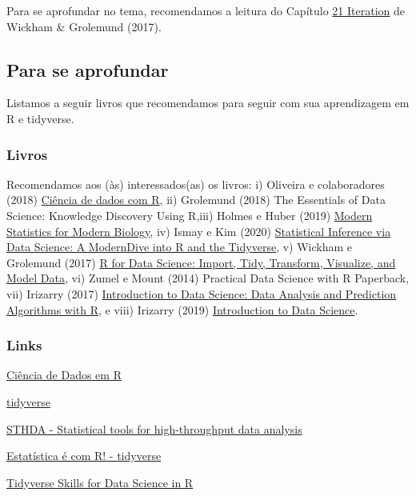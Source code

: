 \documentclass[
]{article}
\begin{document}
Para se aprofundar no tema, recomendamos a leitura do Capítulo \href{https://r4ds.had.co.nz/iteration.html}{21 Iteration} de Wickham \& Grolemund (2017).

\hypertarget{para-se-aprofundar-1}{%
\subsection{Para se aprofundar}\label{para-se-aprofundar-1}}

Listamos a seguir livros que recomendamos para seguir com sua aprendizagem em R e tidyverse.

\hypertarget{livros-1}{%
\subsubsection{Livros}\label{livros-1}}

Recomendamos aos (às) interessados(as) os livros: i) Oliveira e colaboradores (2018) \href{https://cdr.ibpad.com.br/}{Ciência de dados com R}, ii) Grolemund (2018) The Essentials of Data Science: Knowledge Discovery Using R,iii) Holmes e Huber (2019) \href{https://www.huber.embl.de/msmb/}{Modern Statistics for Modern Biology}, iv) Ismay e Kim (2020) \href{https://moderndive.com/}{Statistical Inference via Data Science: A ModernDive into R and the Tidyverse}, v) Wickham e Grolemund (2017) \href{https://r4ds.had.co.nz/}{R for Data Science: Import, Tidy, Transform, Visualize, and Model Data}, vi) Zumel e Mount (2014) Practical Data Science with R Paperback, vii) Irizarry (2017) \href{https://leanpub.com/dataanalysisforthelifesciences}{Introduction to Data Science: Data Analysis and Prediction Algorithms with R}, e viii) Irizarry (2019) \href{https://rafalab.github.io/dsbook/}{Introduction to Data Science}.

\hypertarget{links-1}{%
\subsubsection{Links}\label{links-1}}

\href{https://livro.curso-r.com/}{Ciência de Dados em R}

\href{https://www.tidyverse.org/}{tidyverse}

\href{http://www.sthda.com/english/}{STHDA - Statistical tools for high-throughput data analysis}

\href{http://www.estatisticacomr.uff.br/?page_id=741}{Estatística é com R! - tidyverse}

\href{https://www.stephaniehicks.com/blog/tidyverse-skills-for-data-science-in-r-coursera-specialization/}{Tidyverse Skills for Data Science in R}
\end{document}
